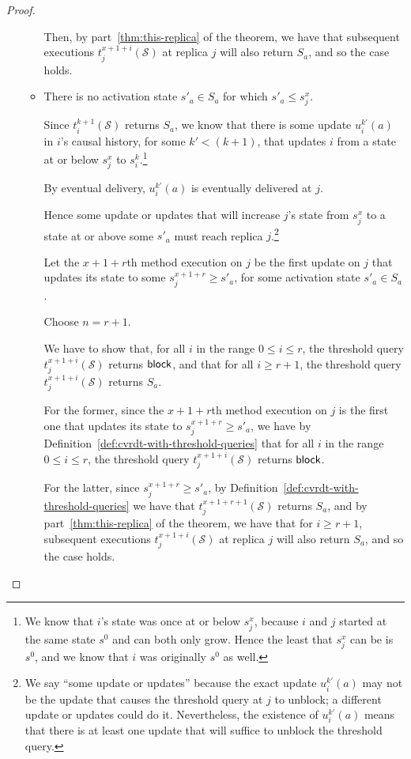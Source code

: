 \begin{proof}
\begin{itemize}
\begin{itemize}
      Then, by part~\ref{thm:this-replica} of the theorem, we have
      that subsequent executions $t^{x+1+i}_j(\mathcal{S})$ at replica
      $j$ will also return $S_a$, and so the case holds.

    \item
      There is no activation state $s'_a \in S_a$ for which $s'_a \leq
      s^x_j$.

      Since $t^{k+1}_i(\mathcal{S})$ returns $S_a$, we know that there
      is some update $u^{k'}_i(a)$ in $i$'s causal history, for some
      $k' < (k+1)$, that updates $i$ from a state at or below $s^x_j$
      to $s^k_i$.\footnote{We know that $i$'s state was once at or
        below $s^x_j$, because $i$ and $j$ started at the same state
        $s^0$ and can both only grow.  Hence the least that $s^x_j$
        can be is $s^0$, and we know that $i$ was originally $s^0$ as
        well.}

      By eventual delivery, $u^{k'}_i(a)$ is eventually delivered at
      $j$.

      Hence some update or updates that will increase $j$'s state from
      $s^x_j$ to a state at or above some $s'_a$ must reach replica
      $j$.\footnote{We say ``some update or updates'' because the
        exact update $u^{k'}_i(a)$ may not be the update that causes
        the threshold query at $j$ to unblock; a different update or
        updates could do it.  Nevertheless, the existence of
        $u^{k'}_i(a)$ means that there is at least one update that
        will suffice to unblock the threshold query.}

      Let the $x+1+r$th method execution on $j$ be the first update on $j$
      that updates its state to some $s^{x+1+r}_j \geq s'_a$, for some
      activation state $s'_a \in S_a$.

      Choose $n = r+1$.

      We have to show that, for all $i$ in the range $0 \leq i \leq
      r$, the threshold query $t^{x+1+i}_j(\mathcal{S})$ returns
      $\textsf{block}$, and that for all $i \geq r+1$, the threshold query
      $t^{x+1+i}_j(\mathcal{S})$ returns $S_a$.

      For the former, since the $x+1+r$th method execution on $j$ is the
      first one that updates its state to $s^{x+1+r}_j \geq s'_a$, we have
      by Definition~\ref{def:cvrdt-with-threshold-queries} that for all $i$
      in the range $0 \leq i \leq r$, the threshold query
      $t^{x+1+i}_j(\mathcal{S})$ returns $\textsf{block}$.

      For the latter, since $s^{x+1+r}_j \geq s'_a$, by
      Definition~\ref{def:cvrdt-with-threshold-queries} we have that
      $t^{x+1+r+1}_j(\mathcal{S})$ returns $S_a$, and by
      part~\ref{thm:this-replica} of the theorem, we have that for $i \geq
      r+1$, subsequent executions $t^{x+1+i}_j(\mathcal{S})$ at replica $j$
      will also return $S_a$, and so the case holds.
    \end{itemize}


\end{itemize}
\end{proof}
